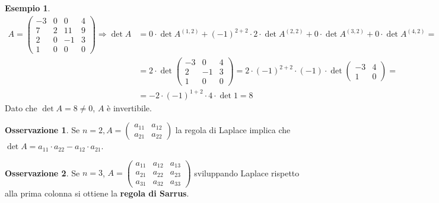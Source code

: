 \documentclass[a4paper]{article}
\theoremstyle{definition}
\newtheorem*{oss}{Osservazione}
\newtheorem*{es}{Esempio}
\begin{document}
\begin{es}
	\begin{align*}
		A = \begin{pmatrix}
			    - 3 & 0 & 0   & 4 \\
			    7   & 2 & 11  & 9 \\
			    2   & 0 & - 1 & 3 \\
			    1   & 0 & 0   & 0
		    \end{pmatrix} \Rightarrow \det A & = 0 \cdot \det A^{(1, 2)} + ( - 1)^{2 + 2} \cdot 2 \cdot \det A^{(2, 2)} + 0 \cdot \det A^{(3, 2)} + 0 \cdot \det A^{(4, 2)} = \\
		                                 & = 2 \cdot \det \begin{pmatrix}
			                                                  -3 & 0   & 4 \\
			                                                  2  & - 1 & 3 \\
			                                                  1  & 0   & 0
		                                                  \end{pmatrix} = 2 \cdot ( - 1)^{2 + 2} \cdot ( - 1) \cdot \det \begin{pmatrix}
			                                                                                                                 - 3 & 4 \\
			                                                                                                                 1   & 0
		                                                                                                                 \end{pmatrix} =                                      \\
		                                 & = - 2 \cdot ( - 1)^{1 + 2} \cdot 4 \cdot \det 1 = 8
	\end{align*}
	Dato che $\det A = 8 \neq 0$, $A$ è invertibile.
\end{es}
\begin{oss}
	Se $n = 2, A = \begin{pmatrix}
			a_{11} & a_{12} \\
			a_{21} & a_{22}
		\end{pmatrix}$ la regola di Laplace implica che $\det A = a_{11} \cdot a_{22} - a_{12} \cdot a_{21}$.
\end{oss}
\begin{oss}
	Se $n = 3$, $A = \begin{pmatrix}
			a_{11} & a_{12} & a_{13} \\
			a_{21} & a_{22} & a_{23} \\
			a_{31} & a_{32} & a_{33}
		\end{pmatrix}$ sviluppando Laplace rispetto alla prima colonna si ottiene la \textbf{regola di Sarrus}.
\end{oss}
\end{document}
